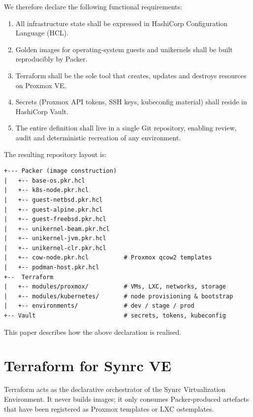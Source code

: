 \documentclass{article}
\begin{document}
We therefore declare the following functional requirements:

\begin{enumerate}[leftmargin=*]
  \item All infrastructure state shall be expressed in HashiCorp Configuration Language (HCL).
  \item Golden images for operating-system guests and unikernels shall be built reproducibly by Packer.
  \item Terraform shall be the sole tool that creates, updates and destroys resources on Proxmox VE.
  \item Secrets (Proxmox API tokens, SSH keys, kubeconfig material) shall reside in HashiCorp Vault.
  \item The entire definition shall live in a single Git repository, enabling review, audit and deterministic recreation of any environment.
\end{enumerate}

\newpage
The resulting repository layout is:


\begin{verbatim}
+--- Packer (image construction)
|   +-- base-os.pkr.hcl
|   +-- k8s-node.pkr.hcl
|   +-- guest-netbsd.pkr.hcl
|   +-- guest-alpine.pkr.hcl
|   +-- guest-freebsd.pkr.hcl
|   +-- unikernel-beam.pkr.hcl
|   +-- unikernel-jvm.pkr.hcl
|   +-- unikernel-clr.pkr.hcl
|   +-- cow-node.pkr.hcl          # Proxmox qcow2 templates
|   +-- podman-host.pkr.hcl
+--  Terraform
|   +-- modules/proxmox/          # VMs, LXC, networks, storage
|   +-- modules/kubernetes/       # node provisioning & bootstrap
|   +-- environments/             # dev / stage / prod
+-- Vault                         # secrets, tokens, kubeconfig
\end{verbatim}

This paper describes how the above declaration is realised.

\section{Terraform for Synrc VE}

Terraform acts as the declarative orchestrator of the Synrc Virtualization Environment. It never builds images; it only consumes Packer-produced artefacts that have been registered as Proxmox templates or LXC ostemplates.
\end{document}
